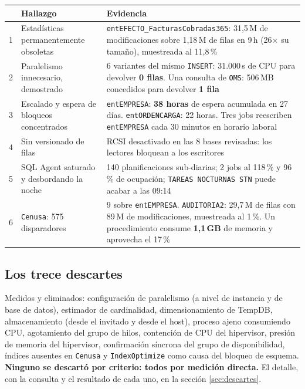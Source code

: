 \documentclass[11pt,a4paper]{article}
\newcommand{\cod}[1]{\texttt{\small #1}}
\begin{document}
\begin{longtable}{p{0.4cm}p{6.6cm}p{8.6cm}}
\toprule
& \textbf{Hallazgo} & \textbf{Evidencia} \\
\midrule
\endhead
1 & Estadísticas permanentemente obsoletas
  & \cod{entEFECTO\_FacturasCobradas365}: 31,5\,M de modificaciones sobre
    1,18\,M de filas en 9\,h (26$\times$ su tamaño), muestreada al 11,8\,\% \\
2 & Paralelismo innecesario, demostrado
  & 6 variantes del mismo \cod{INSERT}: 31.000\,s de CPU para devolver
    \textbf{0 filas}. Una consulta de \cod{OMS}: 506\,MB concedidos para
    devolver \textbf{1 fila} \\
3 & Escalado y espera de bloqueos concentrados
  & \cod{entEMPRESA}: \textbf{38 horas} de espera acumulada en 27 días.
    \cod{entORDENCARGA}: 22 horas. Tres jobs reescriben \cod{entEMPRESA}
    cada 30 minutos en horario laboral \\
4 & Sin versionado de filas
  & RCSI desactivado en las 8 bases revisadas: los lectores bloquean a los
    escritores \\
5 & SQL Agent saturado y desbordando la noche
  & 140 planificaciones sub-diarias; 2 jobs al 118\,\% y 96\,\% de ocupación;
    \cod{TAREAS NOCTURNAS STN} puede acabar a las 09:14 \\
6 & \cod{Cenusa}: 575 disparadores
  & 9 sobre \cod{entEMPRESA}. \cod{AUDITORIA2}: 29,7\,M de filas con 89\,M de
    modificaciones, muestreada al 1\,\%. Un procedimiento consume
    \textbf{1,1\,GB} de memoria y aprovecha el 17\,\% \\
\bottomrule
\end{longtable}

\subsection*{Los trece descartes}

Medidos y eliminados: configuración de paralelismo (a nivel de instancia y de
base de datos), estimador de cardinalidad, dimensionamiento de TempDB,
almacenamiento (desde el invitado y desde el host), proceso ajeno consumiendo
CPU, agotamiento del grupo de hilos, contención de CPU del hipervisor,
presión de memoria del hipervisor, confirmación síncrona del grupo de
disponibilidad, índices ausentes en \cod{Cenusa} y \cod{IndexOptimize} como
causa del bloqueo de esquema. \textbf{Ninguno se descartó por criterio: todos
por medición directa.} El detalle, con la consulta y el resultado de cada
uno, en la sección \ref{sec:descartes}.
\end{document}
